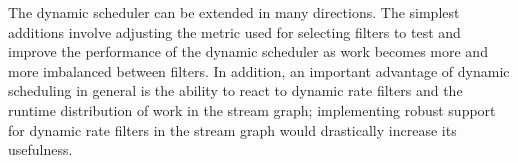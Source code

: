 The dynamic scheduler can be extended in many directions. The simplest additions involve adjusting the metric used for selecting filters to test and improve the performance of the dynamic scheduler as work becomes more and more imbalanced between filters. In addition, an important advantage of dynamic scheduling in general is the ability to react to dynamic rate filters and the runtime distribution of work in the stream graph; implementing robust support for dynamic rate filters in the stream graph would drastically increase its usefulness.
